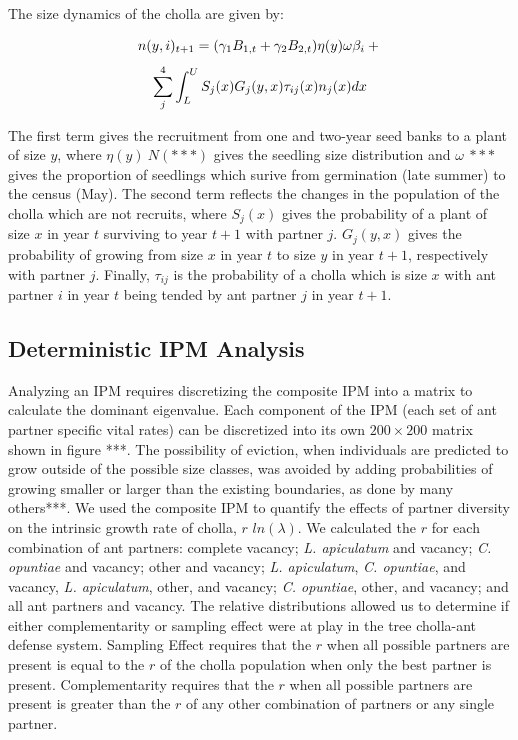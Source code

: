 \documentclass[12pt,a4paper]{article}
\begin{document}
The size dynamics of the cholla are given by:
		
		$$
		n(y,i)_{t+1} = (\gamma_1 B_{1,t} + \gamma_2 B_{2,t}) \eta(y) \omega \beta_i  + \\
		$$
		$$
		\sum_{j}^{4} \int_L^U S_j(x) G_j(y,x) \tau_{ij}(x) n_j(x) dx \\
		$$
		
The first term gives the recruitment from one and two-year seed banks to a plant of size $y$, where $\eta(y) ~ N(***)$ gives the seedling size distribution and $\omega ~ ***$ gives the proportion of seedlings which surive from germination (late summer) to the census (May).
The second term reflects the changes in the population of the cholla which are not recruits, where $S_j(x)$ gives the probability of a plant of size $x$ in year $t$ surviving to year $t+1$ with partner $j$.
$G_j(y,x)$ gives the probability of growing from size $x$ in year $t$ to size $y$ in year $t+1$, respectively with partner $j$. 
Finally, $\tau_{ij}$ is the probability of a cholla which is size $x$ with ant partner $i$ in year $t$ being tended by ant partner $j$ in year $t+1$.

\subsection*{Deterministic IPM Analysis}
Analyzing an IPM requires discretizing the composite IPM into a matrix to calculate the dominant eigenvalue. 
Each component of the IPM (each set of ant partner specific vital rates) can be discretized into its own $ 200 \times 200$ matrix \as shown in figure ***. 
The possibility of eviction, when individuals are predicted to grow outside of the possible size classes, was avoided by adding probabilities of growing smaller or larger than the existing boundaries, as done by many others***.
We used the composite IPM to quantify the effects of partner diversity on the intrinsic growth rate of cholla, $r$ $ln(\lambda)$. 
We calculated the $r$ for each combination of ant partners: complete vacancy; \textit{L. apiculatum} and vacancy; \textit{C. opuntiae} and vacancy; other and vacancy; \textit{L. apiculatum}, \textit{C. opuntiae}, and vacancy, \textit{L. apiculatum}, other, and vacancy; \textit{C. opuntiae}, other, and vacancy; and all ant partners and vacancy.
The relative distributions allowed us to determine if either complementarity or sampling effect were at play in the tree cholla-ant defense system.
Sampling Effect requires that the $r$ when all possible partners are present is equal to the $r$ of the cholla population when only the best partner is present.
Complementarity requires that the $r$ when all possible partners are present is greater than the $r$ of any other combination of partners or any single partner. 
\end{document}
